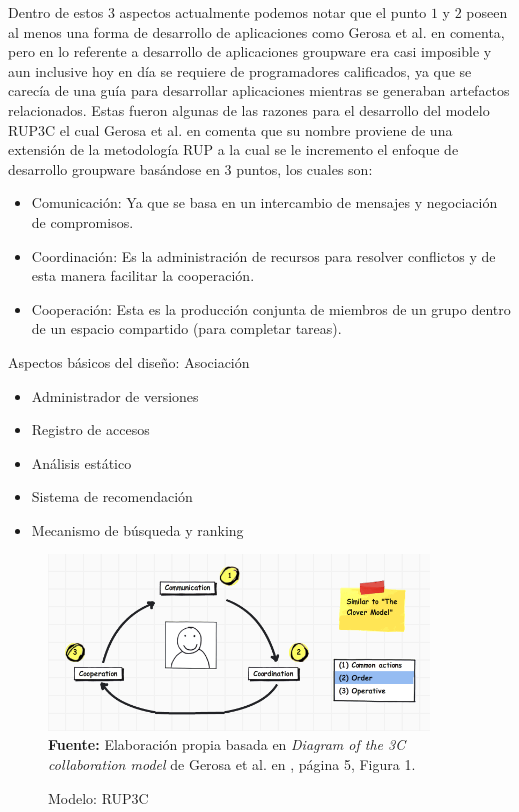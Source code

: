 \documentclass[oneside,12pt,a4paper]{memoir}%
\begin{document}
		Dentro de estos $3$ aspectos actualmente podemos notar que el punto $1$ y $2$
		poseen al menos una forma de desarrollo de aplicaciones como Gerosa et al. en
		\cite{Gerosa2005} comenta, pero en lo referente a desarrollo de aplicaciones groupware era
		casi imposible y aun inclusive hoy en d\'ia se requiere de programadores
		calificados, ya que se carec\'ia de una gu\'ia para desarrollar aplicaciones
		mientras se generaban artefactos relacionados. Estas fueron algunas de las razones para
		el desarrollo del modelo RUP3C el cual Gerosa et al. en \cite{Gerosa2005}
		comenta que su nombre proviene de una extensi\'on de la metodolog\'ia \ac{RUP}
		a la cual se le incremento el enfoque de desarrollo groupware bas\'andose en $3$ puntos, los
		cuales son:
		
		\begin{itemize}
		  \item Comunicaci\'on: Ya que se basa en un intercambio de mensajes y
		  negociaci\'on de compromisos.
		  \item Coordinaci\'on: Es la administraci\'on de recursos para resolver conflictos
		  y de esta manera facilitar la cooperaci\'on.
		  \item Cooperaci\'on: Esta es la producci\'on conjunta de miembros de un grupo
		  dentro de un espacio compartido (para completar tareas).
		\end{itemize}
		
		Aspectos b\'asicos del dise\~no: Asociaci\'on
		
		\begin{itemize}
		  \item Administrador de versiones
		  \item Registro de accesos
		  \item An\'alisis est\'atico
		  \item Sistema de recomendaci\'on
		  \item Mecanismo de b\'usqueda y ranking 
		\end{itemize}
		
		
	    \begin{figure}[here]
	    	\centering
	    	\caption{Modelo: RUP3C}
	    	\includegraphics[width=0.9\textwidth]{figure/fig_rup3cModel.png}
			\newline
			\textbf{Fuente:} Elaboraci\'on propia basada en \textit{Diagram of the 3C
			collaboration model} de Gerosa et al. en \cite{Gerosa2005}, p\'agina 5,
			Figura 1.
			\label{fig:RUP3CModel}
	    \end{figure}
		
\end{document}
